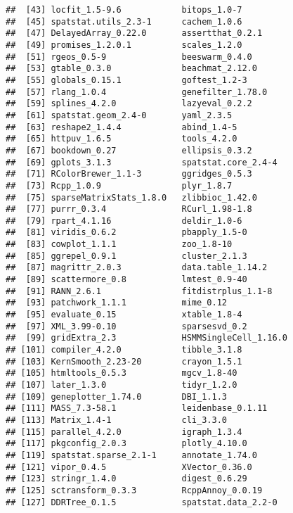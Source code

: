 \documentclass[
  openany]{book}
\begin{document}
\begin{verbatim}
##  [43] locfit_1.5-9.6            bitops_1.0-7             
##  [45] spatstat.utils_2.3-1      cachem_1.0.6             
##  [47] DelayedArray_0.22.0       assertthat_0.2.1         
##  [49] promises_1.2.0.1          scales_1.2.0             
##  [51] rgeos_0.5-9               beeswarm_0.4.0           
##  [53] gtable_0.3.0              beachmat_2.12.0          
##  [55] globals_0.15.1            goftest_1.2-3            
##  [57] rlang_1.0.4               genefilter_1.78.0        
##  [59] splines_4.2.0             lazyeval_0.2.2           
##  [61] spatstat.geom_2.4-0       yaml_2.3.5               
##  [63] reshape2_1.4.4            abind_1.4-5              
##  [65] httpuv_1.6.5              tools_4.2.0              
##  [67] bookdown_0.27             ellipsis_0.3.2           
##  [69] gplots_3.1.3              spatstat.core_2.4-4      
##  [71] RColorBrewer_1.1-3        ggridges_0.5.3           
##  [73] Rcpp_1.0.9                plyr_1.8.7               
##  [75] sparseMatrixStats_1.8.0   zlibbioc_1.42.0          
##  [77] purrr_0.3.4               RCurl_1.98-1.8           
##  [79] rpart_4.1.16              deldir_1.0-6             
##  [81] viridis_0.6.2             pbapply_1.5-0            
##  [83] cowplot_1.1.1             zoo_1.8-10               
##  [85] ggrepel_0.9.1             cluster_2.1.3            
##  [87] magrittr_2.0.3            data.table_1.14.2        
##  [89] scattermore_0.8           lmtest_0.9-40            
##  [91] RANN_2.6.1                fitdistrplus_1.1-8       
##  [93] patchwork_1.1.1           mime_0.12                
##  [95] evaluate_0.15             xtable_1.8-4             
##  [97] XML_3.99-0.10             sparsesvd_0.2            
##  [99] gridExtra_2.3             HSMMSingleCell_1.16.0    
## [101] compiler_4.2.0            tibble_3.1.8             
## [103] KernSmooth_2.23-20        crayon_1.5.1             
## [105] htmltools_0.5.3           mgcv_1.8-40              
## [107] later_1.3.0               tidyr_1.2.0              
## [109] geneplotter_1.74.0        DBI_1.1.3                
## [111] MASS_7.3-58.1             leidenbase_0.1.11        
## [113] Matrix_1.4-1              cli_3.3.0                
## [115] parallel_4.2.0            igraph_1.3.4             
## [117] pkgconfig_2.0.3           plotly_4.10.0            
## [119] spatstat.sparse_2.1-1     annotate_1.74.0          
## [121] vipor_0.4.5               XVector_0.36.0           
## [123] stringr_1.4.0             digest_0.6.29            
## [125] sctransform_0.3.3         RcppAnnoy_0.0.19         
## [127] DDRTree_0.1.5             spatstat.data_2.2-0      

\end{verbatim}
\end{document}
